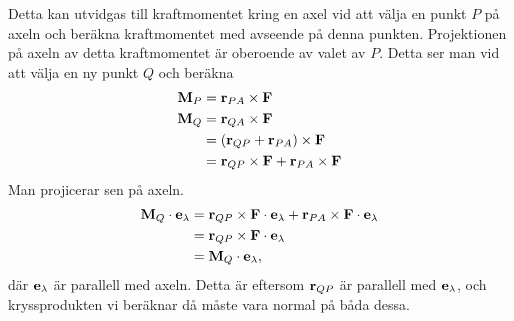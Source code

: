 Detta kan utvidgas till kraftmomentet kring en axel vid att välja en punkt $P$ på axeln och beräkna kraftmomentet med avseende på denna punkten. Projektionen på axeln av detta kraftmomentet är oberoende av valet av $P$. Detta ser man vid att välja en ny punkt $Q$ och beräkna
\begin{align*}
	\vect{M}_P &= \vect{r}_{PA}\times\vect{F} \\
	\vect{M}_Q &= \vect{r}_{QA}\times\vect{F} \\
	           &= (\vect{r}_{QP} + \vect{r}_{PA})\times\vect{F} \\
	           &= \vect{r}_{QP}\times\vect{F} + \vect{r}_{PA}\times\vect{F}
\end{align*}
Man projicerar sen på axeln.
\begin{align*}
	\vect{M}_Q\cdot\vect{e}_\lambda &= \vect{r}_{QP}\times\vect{F}\cdot\vect{e}_\lambda + \vect{r}_{PA}\times\vect{F}\cdot\vect{e}_\lambda \\
	                                &= \vect{r}_{QP}\times\vect{F}\cdot\vect{e}_\lambda \\
	                                &= \vect{M}_Q\cdot\vect{e}_\lambda,
\end{align*}
där $\vect{e}_\lambda$ är parallell med axeln. Detta är eftersom $\vect{r}_{QP}$ är parallell med $\vect{e}_\lambda$, och kryssprodukten vi beräknar då måste vara normal på båda dessa.